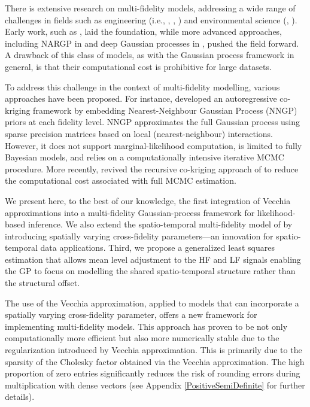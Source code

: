 \documentclass[12pt]{article}
\begin{document}
\noindent
\hangindent=-5mm
There is extensive research on multi-fidelity models, addressing a wide range of challenges in fields such as engineering (i.e., \citet{toal2011efficient}, \cite{peherstorfer2019multifidelity}, \cite{kaps2022hierarchical}) and environmental science (\cite{colombo2025warped}, \cite{babaee2020multifidelity}). Early work, such as \citet{Kennedy2000}, laid the foundation, while more advanced approaches, including NARGP in \citet{perdikaris2017nonlinear} and deep Gaussian processes in \citet{damianou2013deep}, pushed the field forward. A drawback of this class of models, as with the Gaussian process framework in general, is that their computational cost is prohibitive for large datasets.

\noindent
\hangindent=-5mm
To address this challenge in the context of multi-fidelity modelling, various approaches have been proposed. For instance, \citet{cheng2021hierarchical} developed an autoregressive co-kriging framework by embedding Nearest-Neighbour Gaussian Process (NNGP) priors at each fidelity level. NNGP approximates the full Gaussian process using sparse precision matrices based on local (nearest-neighbour) interactions. However, it does not support marginal-likelihood computation, is limited to fully Bayesian models, and relies on a computationally intensive iterative MCMC procedure. More recently, \citet{cheng2024recursive} revived the recursive co-kriging approach of \citet{le2014recursive} to reduce the computational cost associated with full MCMC estimation.

\noindent
\hangindent=-5mm
We present here, to the best of our knowledge, the first integration of Vecchia approximations into a multi-fidelity Gaussian-process framework for likelihood-based inference. We also extend the spatio-temporal multi-fidelity model of \citet{babaee2020multifidelity} by introducing spatially varying cross-fidelity parameters—an innovation for spatio-temporal data applications. Third, we propose a generalized least squares estimation that allows mean level adjustment to the HF and LF signals enabling the GP to focus on modelling the shared spatio-temporal structure rather than the structural offset.


\noindent
\hangindent=-5mm
The use of the Vecchia approximation, applied to models that can incorporate a spatially varying cross-fidelity parameter, offers a new framework for implementing multi-fidelity models. This approach has proven to be not only computationally more efficient but also more numerically stable due to the regularization introduced by Vecchia approximation. This is primarily due to the sparsity of the Cholesky factor obtained via the Vecchia approximation. The high proportion of zero entries significantly reduces the risk of rounding errors during multiplication with dense vectors (see Appendix \ref{PositiveSemiDefinite} for further details).
\end{document}
